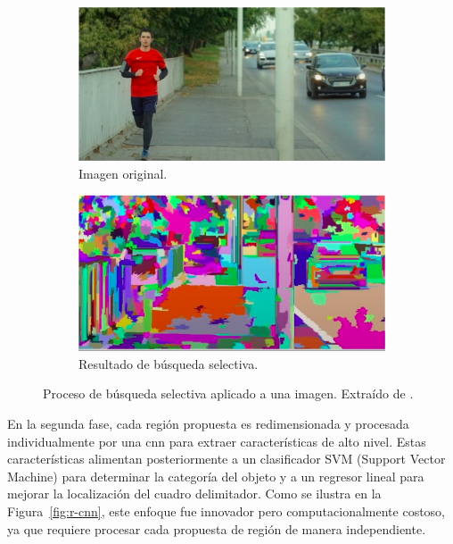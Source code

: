\documentclass[11pt,spanish,listoffigures,listoftables]{tfgetsinf}
\begin{document}
\begin{figure}[H]
   \centering
   \begin{subfigure}[b]{0.45\textwidth}
      \centering
      \includegraphics[width=\textwidth]{images/estado_del_arte/selective_search_original.png}
      \caption[Imagen original]{Imagen original.}
      \label{fig:selective_search_original}
   \end{subfigure}
   \hfill
   \begin{subfigure}[b]{0.45\textwidth}
      \centering
      \includegraphics[width=\textwidth]{images/estado_del_arte/selective_search_result.png}
      \caption[Resultado de búsqueda selectiva]{Resultado de búsqueda selectiva.}     
      \label{fig:selective_search_result}
   \end{subfigure}
   \caption[Proceso de búsqueda selectiva aplicado a una imagen]{Proceso de búsqueda selectiva aplicado a una imagen. Extraído de \cite{explainningAI}.}
   \label{fig:selective_search}
\end{figure}

En la segunda fase, cada región propuesta es redimensionada y procesada individualmente por una \gls{cnn} para extraer características de alto nivel. Estas características alimentan posteriormente a un clasificador SVM (Support Vector Machine) para determinar la categoría del objeto y a un regresor lineal para mejorar la localización del cuadro delimitador. Como se ilustra en la Figura~\ref{fig:r-cnn}, este enfoque fue innovador pero computacionalmente costoso, ya que requiere procesar cada propuesta de región de manera independiente.
\end{document}
